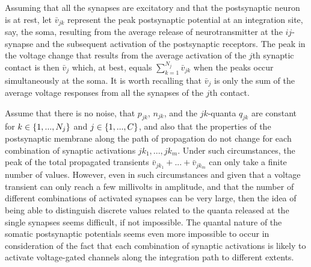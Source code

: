 Assuming that all the synapses are excitatory and that the postsynaptic neuron is at rest, let $\bar{v}_{jk}$ represent  the peak postsynaptic  potential at an integration site, say, the soma, resulting from the average release of neurotransmitter at the $ij$-synapse and the subsequent activation of the postsynaptic receptors. The peak in the voltage change that results from the average activation of the $j$th synaptic contact is then $\bar{v}_{j}$ which, at best, equals $\sum_{k=1}^{N_j} \bar{v}_{jk}$ when the peaks occur simultaneously at the soma. It is worth recalling that $\bar{v}_{j}$ is only the sum of the average voltage responses from all the synapses of the $j$th contact. 

Assume that there is no noise, that $p_{jk}$, $n_{jk}$, and the $jk$-quanta $q_{jk}$ are constant for $k \in \left\{1,...,N_j\right\}$ and $j \in \left\{1,...,C\right\}$, and also that the properties of the postsynaptic membrane along the path of propagation do not change for each combination of synaptic activations $jk_1, ..., jk_m$. Under such circumstances, the peak of the total propagated transients $\bar{v}_{jk_1}+...+\bar{v}_{jk_m}$ can only take a finite number of values. However, even in such circumstances and given that a voltage transient can only reach a few millivolts in amplitude, and that the number of different combinations of activated synapses can be very large, then the idea of being able to distinguish discrete values related to the quanta released at the single synapses seems difficult, if not impossible. The quantal nature of the somatic postsynaptic potentials seems even more impossible to occur in consideration of the fact that each combination of synaptic activations is likely to activate voltage-gated channels along the integration path to different extents.



